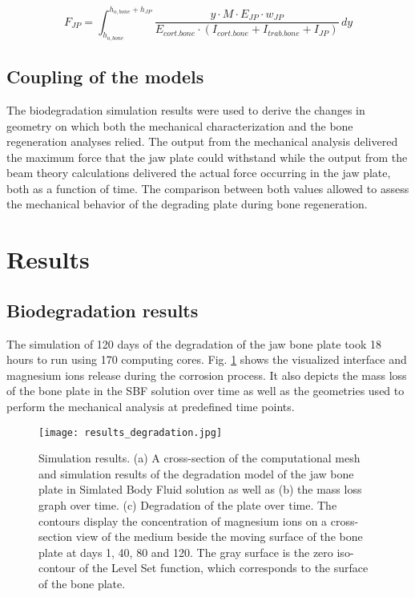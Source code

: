 \begin{equation}
F_{JP}=\int_{h_{o,bone}}^{h_{o,bone}+h_{JP}} \frac{y \cdot M \cdot E_{JP} \cdot w_{JP}}{E_{cort.bone} \cdot (I_{cort.bone}+I_{trab.bone}+I_{JP})}  \,dy
\label{eq:integral}
\end{equation}


\subsection{Coupling of the models}

The biodegradation simulation results were used to derive the changes in geometry on which both the mechanical characterization and the bone regeneration analyses relied. The output from the mechanical analysis delivered the maximum force that the jaw plate could withstand while the output from the beam theory calculations delivered the actual force occurring in the jaw plate, both as a function of time. The comparison between both values allowed to assess the mechanical behavior of the degrading plate during bone regeneration.


\section{Results}
\label{sec:results}

\subsection{Biodegradation results}

The simulation of 120 days of the degradation of the jaw bone plate took 18 hours to run using 170 computing cores. Fig. \ref{fig:results_degradation} shows the visualized interface and magnesium ions release during the corrosion process. It also depicts the mass loss of the bone plate in the {SBF} solution over time as well as the geometries used to perform the mechanical analysis at predefined time points.

\begin{figure}[t]
\centering
\medskip
\texttt{[image: results\_degradation.jpg]}
\caption[Simulation results of the degradation model of the jaw bone plate]{Simulation results. (a) A cross-section of the computational mesh and simulation results of the degradation model of the jaw bone plate in Simlated Body Fluid solution as well as (b) the mass loss graph over time. (c) Degradation of the plate over time. The contours display the concentration of magnesium ions on a cross-section view of the medium beside the moving surface of the bone plate at days 1, 40, 80 and 120. The gray surface is the zero iso-contour of the Level Set function, which corresponds to the surface of the bone plate.} \label{fig:results_degradation}
\end{figure}

